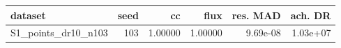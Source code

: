 \begin{tabular}{lrrrrr}
\toprule
dataset & seed & cc & flux & res. MAD & ach. DR \\
\midrule
S1\_points\_dr10\_n103 & 103 & 1.00000 & 1.00000 & 9.69e-08 & 1.03e+07 \\
\bottomrule
\end{tabular}